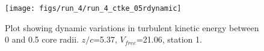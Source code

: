 \begin{figure}[H]
\centering
\texttt{[image: figs/run\_4/run\_4\_ctke\_05rdynamic]}
\caption{Plot showing dynamic variations in turbulent kinetic energy between 0 and 0.5 core radii. $z/c$=5.37, $V_{free}$=21.06, station 1.}
\label{fig:run_4_ctke_05rdynamic}
\end{figure}



